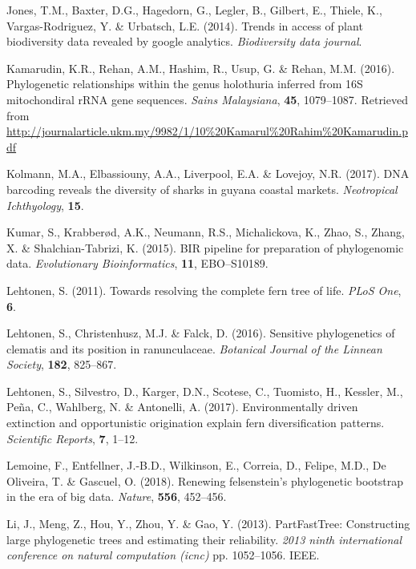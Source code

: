 \documentclass[]{article}
\begin{document}
\leavevmode\hypertarget{ref-jones2014trends}{}%
Jones, T.M., Baxter, D.G., Hagedorn, G., Legler, B., Gilbert, E., Thiele, K., Vargas-Rodriguez, Y. \& Urbatsch, L.E. (2014). Trends in access of plant biodiversity data revealed by google analytics. \emph{Biodiversity data journal}.

\leavevmode\hypertarget{ref-kamarudin2016phylogenetic}{}%
Kamarudin, K.R., Rehan, A.M., Hashim, R., Usup, G. \& Rehan, M.M. (2016). Phylogenetic relationships within the genus holothuria inferred from 16S mitochondiral rRNA gene sequences. \emph{Sains Malaysiana}, \textbf{45}, 1079--1087. Retrieved from \url{http://journalarticle.ukm.my/9982/1/10\%20Kamarul\%20Rahim\%20Kamarudin.pdf}

\leavevmode\hypertarget{ref-kolmann2017dna}{}%
Kolmann, M.A., Elbassiouny, A.A., Liverpool, E.A. \& Lovejoy, N.R. (2017). DNA barcoding reveals the diversity of sharks in guyana coastal markets. \emph{Neotropical Ichthyology}, \textbf{15}.

\leavevmode\hypertarget{ref-kumar2015bir}{}%
Kumar, S., Krabberød, A.K., Neumann, R.S., Michalickova, K., Zhao, S., Zhang, X. \& Shalchian-Tabrizi, K. (2015). BIR pipeline for preparation of phylogenomic data. \emph{Evolutionary Bioinformatics}, \textbf{11}, EBO--S10189.

\leavevmode\hypertarget{ref-lehtonen2011towards}{}%
Lehtonen, S. (2011). Towards resolving the complete fern tree of life. \emph{PLoS One}, \textbf{6}.

\leavevmode\hypertarget{ref-lehtonen2016sensitive}{}%
Lehtonen, S., Christenhusz, M.J. \& Falck, D. (2016). Sensitive phylogenetics of clematis and its position in ranunculaceae. \emph{Botanical Journal of the Linnean Society}, \textbf{182}, 825--867.

\leavevmode\hypertarget{ref-lehtonen2017environmentally}{}%
Lehtonen, S., Silvestro, D., Karger, D.N., Scotese, C., Tuomisto, H., Kessler, M., Peña, C., Wahlberg, N. \& Antonelli, A. (2017). Environmentally driven extinction and opportunistic origination explain fern diversification patterns. \emph{Scientific Reports}, \textbf{7}, 1--12.

\leavevmode\hypertarget{ref-lemoine2018renewing}{}%
Lemoine, F., Entfellner, J.-B.D., Wilkinson, E., Correia, D., Felipe, M.D., De Oliveira, T. \& Gascuel, O. (2018). Renewing felsenstein's phylogenetic bootstrap in the era of big data. \emph{Nature}, \textbf{556}, 452--456.

\leavevmode\hypertarget{ref-li2013partfasttree}{}%
Li, J., Meng, Z., Hou, Y., Zhou, Y. \& Gao, Y. (2013). PartFastTree: Constructing large phylogenetic trees and estimating their reliability. \emph{2013 ninth international conference on natural computation (icnc)} pp. 1052--1056. IEEE.
\end{document}

